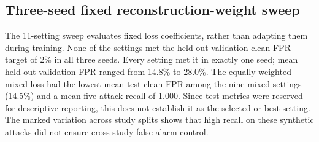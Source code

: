 \documentclass[journal]{IEEEtran}
\begin{document}
  \subsection{Three-seed fixed reconstruction-weight sweep}
  The 11-setting sweep evaluates fixed loss coefficients, rather than adapting them during training. None of the settings met the held-out validation clean-FPR target of 2\% in all three seeds. Every setting met it in exactly one seed; mean held-out validation FPR ranged from 14.8\% to 28.0\%. The equally weighted mixed loss had the lowest mean test clean FPR among the nine mixed settings (14.5\%) and a mean five-attack recall of 1.000. Since test metrics were reserved for descriptive reporting, this does not establish it as the selected or best setting. The marked variation across study splits shows that high recall on these synthetic attacks did not ensure cross-study false-alarm control.
\end{document}

